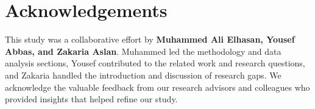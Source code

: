 \section{Acknowledgements}
This study was a collaborative effort by \textbf{Muhammed Ali Elhasan, Yousef Abbas, and Zakaria Aslan}. Muhammed led the methodology and data analysis sections, Yousef contributed to the related work and research questions, and Zakaria handled the introduction and discussion of research gaps. We acknowledge the valuable feedback from our research advisors and colleagues who provided insights that helped refine our study.
